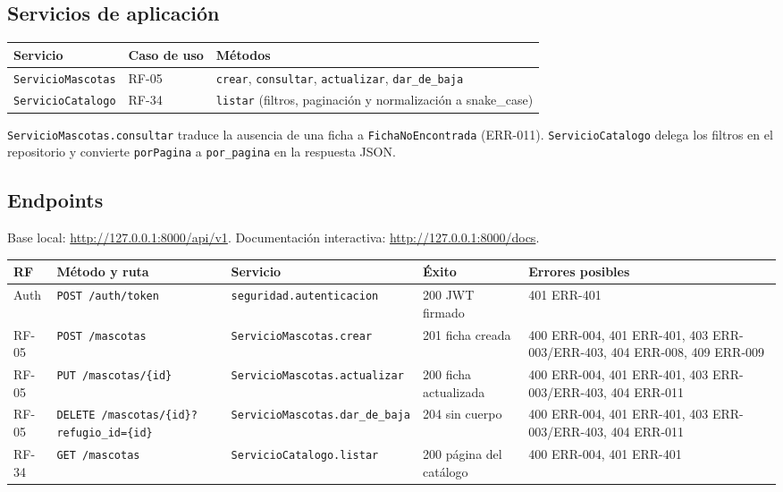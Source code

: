 \documentclass[11pt,a4paper]{article}
\newcommand{\code}[1]{\texttt{#1}}
\newcommand{\thead}[1]{\textbf{#1}}
\begin{document}
\subsection{Servicios de aplicación}

{\footnotesize
\begin{tabularx}{\linewidth}{@{}V{0.7}V{0.8}V{1.5}@{}}
\toprule
\thead{Servicio} & \thead{Caso de uso} & \thead{Métodos} \\ \midrule
\code{ServicioMascotas} & RF-05 &
\code{crear}, \code{consultar}, \code{actualizar}, \code{dar\_de\_baja} \\
\code{ServicioCatalogo} & RF-34 &
\code{listar} (filtros, paginación y normalización a snake\_case) \\
\bottomrule
\end{tabularx}
}

\code{ServicioMascotas.consultar} traduce la ausencia de una ficha a
\code{FichaNoEncontrada} (ERR-011). \code{ServicioCatalogo} delega los filtros
en el repositorio y convierte \code{porPagina} a \code{por\_pagina} en la
respuesta JSON.

\subsection{Endpoints}

Base local: \url{http://127.0.0.1:8000/api/v1}. Documentación interactiva:
\url{http://127.0.0.1:8000/docs}.

{\footnotesize
\begin{tabularx}{\linewidth}{@{}V{0.35}V{1.35}V{1.2}V{0.9}V{1.2}@{}}
\toprule
\thead{RF} & \thead{Método y ruta} & \thead{Servicio} & \thead{Éxito} &
\thead{Errores posibles} \\ \midrule
Auth & \code{POST /auth/token} & \code{seguridad.autenticacion} &
200 JWT firmado & 401 ERR-401 \\
RF-05 & \code{POST /mascotas} & \code{ServicioMascotas.crear} &
201 ficha creada & 400 ERR-004, 401 ERR-401, 403 ERR-003/ERR-403,
404 ERR-008, 409 ERR-009 \\
RF-05 & \code{PUT /mascotas/\{id\}} & \code{ServicioMascotas.actualizar} &
200 ficha actualizada & 400 ERR-004, 401 ERR-401, 403 ERR-003/ERR-403,
404 ERR-011 \\
RF-05 & \code{DELETE /mascotas/\{id\}?refugio\_id=\{id\}} &
\code{ServicioMascotas.dar\_de\_baja} & 204 sin cuerpo &
400 ERR-004, 401 ERR-401, 403 ERR-003/ERR-403, 404 ERR-011 \\
RF-34 & \code{GET /mascotas} & \code{ServicioCatalogo.listar} &
200 página del catálogo & 400 ERR-004, 401 ERR-401 \\
\bottomrule
\end{tabularx}
}
\end{document}

